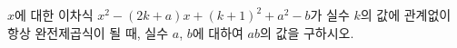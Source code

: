 $x$에 대한 이차식 $x^2-(2k+a)x+(k+1)^2+a^2-b$가 실수 $k$의 값에 관계없이 항상 완전제곱식이 될 때, 실수 $a$, $b$에 대하여 $ab$의 값을 구하시오.
